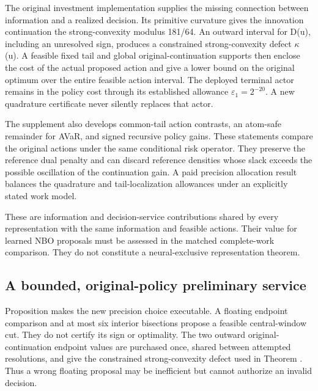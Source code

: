The original investment implementation supplies the missing connection between information and a realized decision. Its primitive curvature gives the innovation continuation the strong-convexity modulus 181/64. An outward interval for D(u), including an unresolved sign, produces a constrained strong-convexity defect \ensuremath{\kappa}(u). A feasible fixed tail and global original-continuation supports then enclose the cost of the actual proposed action and give a lower bound on the original optimum over the entire feasible action interval. The deployed terminal actor remains in the policy cost through its established allowance \(\varepsilon_1=2^{-20}\). A new quadrature certificate never silently replaces that actor.

The supplement also develops common-tail action contrasts, an atom-safe remainder for AVaR, and signed recursive policy gains. These statements compare the original actions under the same conditional risk operator. They preserve the reference dual penalty and can discard reference densities whose slack exceeds the possible oscillation of the continuation gain. A paid precision allocation result balances the quadrature and tail-localization allowances under an explicitly stated work model.

These are information and decision-service contributions shared by every representation with the same information and feasible actions. Their value for learned NBO proposals must be assessed in the matched complete-work comparison. They do not constitute a neural-exclusive representation theorem.

\hypertarget{a-bounded-original-policy-preliminary-service}{%
\subsection{A bounded, original-policy preliminary service}\label{a-bounded-original-policy-preliminary-service}}

Proposition  makes the new precision choice executable. A floating endpoint comparison and at most six interior bisections propose a feasible central-window cut. They do not certify its sign or optimality. The two outward original-continuation endpoint values are purchased once, shared between attempted resolutions, and give the constrained strong-convexity defect used in Theorem . Thus a wrong floating proposal may be inefficient but cannot authorize an invalid decision.

